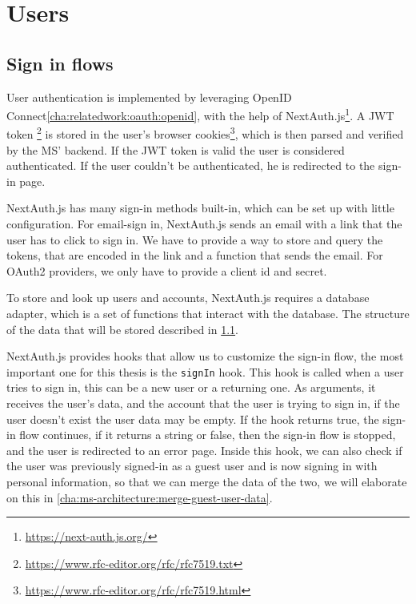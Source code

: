 
\section{Users}


%

\subsection{Sign in flows}

User authentication is implemented by leveraging OpenID Connect\ref{cha:relatedwork:oauth:openid},
with the help of NextAuth.js\footnote{\url{https://next-auth.js.org/}}.
A JWT token \footnote{\url{https://www.rfc-editor.org/rfc/rfc7519.txt}}
is stored in the user's browser cookies\footnote{\url{https://www.rfc-editor.org/rfc/rfc7519.html}},
which is then parsed and verified by the MS' backend.
If the JWT token is valid the user is considered authenticated.
If the user couldn't be authenticated, he is redirected to the sign-in page.

NextAuth.js has many sign-in methods built-in, which can be set up with little configuration.
For email-sign in, NextAuth.js sends an email with a link that the user has to click to
sign in.
We have to provide a way to store and query the tokens, that are encoded in the link and a
function that sends the email.
For OAuth2 providers, we only have to provide a client id and secret.

To store and look up users and accounts, NextAuth.js requires a database adapter,
which is a set of functions that interact with the database.
The structure of the data that will be stored described in \ref{}.

NextAuth.js provides hooks that allow us to customize the sign-in flow, the most important
one for this thesis is the \lstinline{signIn} hook.
This hook is called when a user tries to sign in, this can be a new user or a returning
one.
As arguments, it receives the user's data, and the account that the user is trying to sign
in, if the user doesn't exist the user data may be empty.
If the hook returns true, the sign-in flow continues, if it returns a string or false,
then the sign-in flow is stopped, and the user is redirected to an error page.
Inside this hook, we can also check if the user was previously signed-in as a guest user
and is now signing in with personal information, so that we can merge the data of the two,
we will elaborate on this in \ref{cha:ms-architecture:merge-guest-user-data}.

